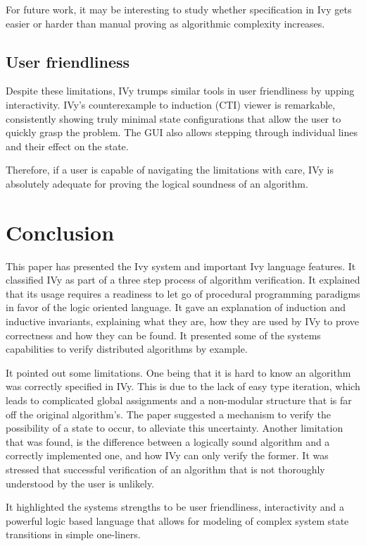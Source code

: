 \documentclass[fleqn]{article}
\begin{document}
For future work, it may be interesting to study whether specification in Ivy gets easier or harder than manual proving as algorithmic complexity increases.


\subsection{User friendliness}
Despite these limitations, IVy trumps similar tools in user friendliness by upping interactivity. \cite{ivy}
IVy's counterexample to induction (CTI) viewer is remarkable, consistently showing truly minimal
state configurations that allow the user to quickly grasp the problem. The GUI also allows stepping
through individual lines and their effect on the state.


Therefore, if a user is capable of navigating the limitations with care, IVy is absolutely adequate for proving the logical soundness of an algorithm.



\section{Conclusion}
This paper has presented the Ivy system and important Ivy language features. It classified IVy
as part of a three step process of algorithm verification.
It explained that its usage requires a readiness to let go of procedural programming paradigms
in favor of the logic oriented language. It gave an explanation of induction and inductive invariants,
explaining what they are, how they are used by IVy to prove correctness and how they can be found.
It presented some of the systems capabilities to verify distributed algorithms by example.

It pointed out some limitations. One being that it is hard to know an algorithm was correctly specified in IVy. This is due to
the lack of easy type iteration, which leads to complicated global assignments and a non-modular structure that is far off
the original algorithm's.
The paper suggested a mechanism to verify the possibility of a state to occur, to alleviate this uncertainty.
Another limitation that was found, is the difference between a logically sound algorithm and a correctly implemented one, and how IVy can only verify the former.
It was stressed that successful verification of an algorithm that is not thoroughly understood by the user is unlikely.

It highlighted the systems strengths to be user friendliness, interactivity and a powerful logic based language that allows for
modeling of complex system state transitions in simple one-liners.
\end{document}
